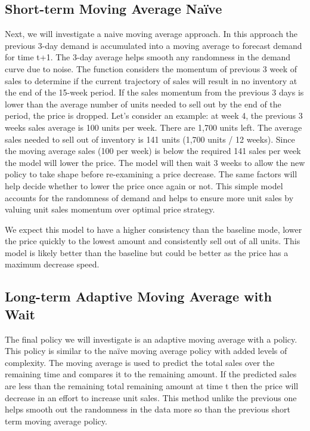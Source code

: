 \documentclass[11pt,a4paper]{article}
\begin{document}
\subsection{Short-term Moving Average Naïve}
Next, we will investigate a naive moving average approach. 
In this approach the previous 3-day demand is accumulated into a moving average to forecast demand for time t+1. 
The 3-day average helps smooth any randomness in the demand curve due to noise. 
The function considers the momentum of previous 3 week of sales to determine if the current trajectory of sales will result in no inventory at the end of the 15-week period. 
If the sales momentum from the previous 3 days is lower than the average number of units needed to sell out by the end of the period, the price is dropped. 
Let’s consider an example: at week 4, the previous 3 weeks sales average is 100 units per week. There are 1,700 units left. 
The average sales needed to sell out of inventory is 141 units (1,700 units / 12 weeks). 
Since the moving average sales (100 per week) is below the required 141 sales per week the model will lower the price. 
The model will then wait 3 weeks to allow the new policy to take shape before re-examining a price decrease. 
The same factors will help decide whether to lower the price once again or not. 
This simple model accounts for the randomness of demand and helps to ensure more unit sales by valuing unit sales momentum over optimal price strategy.

We expect this model to have a higher consistency than the baseline mode, lower the price quickly to the lowest amount and consistently sell out of all units.  
This model is likely better than the baseline but could be better as the price has a maximum decrease speed.

\subsection{Long-term Adaptive Moving Average with Wait}
The final policy we will investigate is an adaptive moving average with a policy. 
This policy is similar to the naïve moving average policy with added levels of complexity. 
The moving average is used to predict the total sales over the remaining time and compares it to the remaining amount. 
If the predicted sales are less than the remaining total remaining amount at time t then the price will decrease in an effort to increase unit sales. 
This method unlike the previous one helps smooth out the randomness in the data more so than the previous short term moving average policy. 
\end{document}
